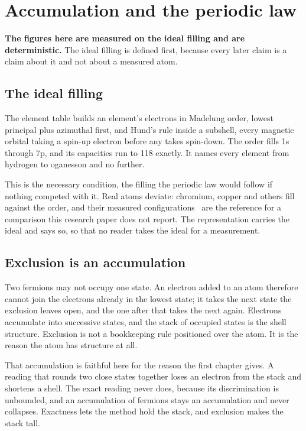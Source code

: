 \chapter{Accumulation and the periodic law}

\textbf{The figures here are measured on the ideal filling and are deterministic.} The ideal filling
is defined first, because every later claim is a claim about it and not about a measured atom.

\section{The ideal filling}

The element table builds an element's electrons in Madelung order, lowest principal plus azimuthal
first, and Hund's rule inside a subshell, every magnetic orbital taking a spin-up electron before any
takes spin-down. The order fills 1s through 7p, and its capacities run to 118 exactly. It names every
element from hydrogen to oganesson and no further.

This is the necessary condition, the filling the periodic law would follow if nothing competed with
it. Real atoms deviate: chromium, copper and others fill against the order, and their measured
configurations~\cite{src:NIST-Atomic-Spectra-Database} are the reference for a comparison this
research paper does not report. The representation carries the ideal and says so, so that no reader
takes the ideal for a measurement.

\section{Exclusion is an accumulation}

Two fermions may not occupy one state. An electron added to an atom therefore cannot join the
electrons already in the lowest state; it takes the next state the exclusion leaves open, and the one
after that takes the next again. Electrons accumulate into successive states, and the stack of
occupied states is the shell structure. Exclusion is not a bookkeeping rule positioned over the atom. It is
the reason the atom has structure at all.

That accumulation is faithful here for the reason the first chapter gives. A reading that rounds two
close states together loses an electron from the stack and shortens a shell. The exact reading never
does, because its discrimination is unbounded, and an accumulation of fermions stays an accumulation
and never collapses. Exactness lets the method hold the stack, and exclusion makes the stack tall.

